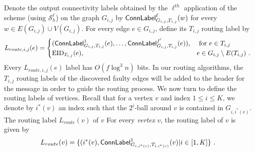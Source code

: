 Denote the output connectivity labels obtained by the ${\ell}^{th}$ application of the scheme (using $\mathcal{S}^\ell_h$) on the graph $G_{i,j}$ by $\mathsf{ConnLabel}^{\ell}_{G_{i,j},T_{i,j}}(w)$ for every $w \in E(G_{i,j})\cup V(G_{i,j})$. For every edge $e \in G_{i,j}$, define its $T_{i,j}$ routing label by
\begin{equation}\label{eq:route-edge-label}
    L_{route,i,j}(e)=
    \begin{cases}
      (\mathsf{ConnLabel}^1_{G_{i,j},T_{i,j}}(e),\ldots,\mathsf{ConnLabel}^{f'}_{G_{i,j},T_{i,j}}(e)),& \mbox{~for~} e \in T_{i,j} \\
     \operatorname{EID}_{T_{i,j}}(e),& e \in G_{i,j}\setminus E(T_{i,j})~.
    \end{cases}
\end{equation}
Every $L_{route,i,j}(e)$ label has $O(f \log^3 n)$ bits. 
In our routing algorithms, the $T_{i,j}$ routing labels of the discovered faulty edges will be added to the header for the message in order to guide the routing process. 
We now turn to define the routing labels of vertices. Recall that for a vertex $v$ and index $1 \leq i \leq K$, we denote by $i^*(v)$ an index such that the $2^i$-ball around $v$ is contained in $G_{i,i^*(v)}$.
The routing label $L_{route}(v)$ of $v$ 
For every \emph{vertex} $v$, the routing label of $v$ is given by
\begin{equation}\label{eq:Label-route-vertex}
L_{route}(v) = \{(i^*(v), \mathsf{ConnLabel}^1_{G_{i,i^*(v)},T_{i,i^*(v)}}(v) | i \in [1,K]\}~.
\end{equation}


